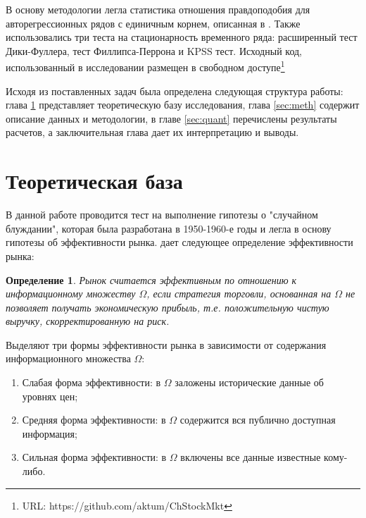 \documentclass[a4paper,12pt]{article}
\newtheorem{definition}{Определение}
\begin{document}
В основу методологии легла статистика отношения правдоподобия для авторегрессионных рядов с единичным корнем, описанная в \cite{Dickey1981}. Также использовались три теста на стационарность временного ряда: расширенный тест Дики-Фуллера, тест Филлипса-Перрона и KPSS тест. Исходный код, использованный в исследовании размещен в свободном доступе{\footnote{URL: https://github.com/aktum/ChStockMkt}}

Исходя из поставленных задач была определена следующая структура работы: глава \ref{sec:litrev} представляет теоретическую базу исследования, глава \ref{sec:meth} содержит описание данных и методологии, в главе \ref{sec:quant} перечислены результаты расчетов, а заключительная глава дает их интерпретацию и выводы.
\newpage
\section{Теоретическая база}\label{sec:litrev}

В данной работе проводится тест на выполнение гипотезы о "случайном блуждании", которая была разработана в 1950-1960-е годы и легла в основу гипотезы об эффективности рынка. \cite{Jensen1978} дает следующее определение эффективности рынка:

\begin{definition}
  Рынок считается эффективным по отношению к информационному множеству $\Omega$, если стратегия торговли, основанная на $\Omega$ не позволяет получать экономическую прибыль, т.е. положительную чистую выручку, скорректированную на риск.
\end{definition}

Выделяют три формы эффективности рынка в зависимости от содержания информационного множества $\Omega$:
\begin{enumerate}
  \item Слабая форма эффективности: в $\Omega$ заложены исторические данные об уровнях цен;
  \item Средняя форма эффективности: в $\Omega$ содержится вся публично доступная информация;
  \item Сильная форма эффективности: в $\Omega$ включены все данные известные кому-либо.
\end{enumerate}
\end{document}
